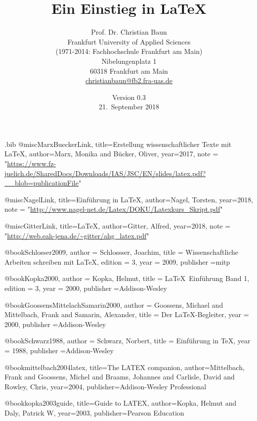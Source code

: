 \documentclass[a4paper,10pt,twoside]{scrbook}
\begin{document}
\begin{filecontents*}{\jobname.bib}
@misc{MarxBueckerLink,
	title={{Erstellung wissenschaftlicher Texte mit \LaTeX}},
	author={Marx, Monika and Bücker, Oliver},
	year={2017},
	note = "\url{https://www.fz-juelich.de/SharedDocs/Downloads/IAS/JSC/EN/slides/latex.pdf?__blob=publicationFile}"
}
   
@misc{NagelLink,
   	title={{Einführung in \LaTeX}},
   	author={Nagel, Torsten},
   	year={2018},
   	note = "\url{http://www.nagel-net.de/Latex/DOKU/Latexkurs_Skript.pdf}"
}

@misc{GitterLink,
	title={{\LaTeX}},
	author={Gitter, Alfred},
	year={2018},
	note = "\url{http://web.eah-jena.de/~gitter/ahg_latex.pdf}"
}

@book{Schlosser2009,
	author = {Schlossser, Joachim},
	title = {{Wissenschaftliche Arbeiten schreiben mit \LaTeX}},
	edition = {3},
	year = {2009},
	publisher ={mitp}
}


@book{Kopka2000,
	author = {Kopka, Helmut},
	title = {{\LaTeX\ Einführung Band 1}},
	edition = {3},
	year = {2000},
	publisher ={Addison-Wesley}
}


@book{GoossensMittelachSamarin2000,
	author = {Goossens, Michael and Mittelbach, Frank and Samarin, Alexander},
	title = {{Der \LaTeX-Begleiter}},
	year = {2000},
	publisher ={Addison-Wesley}
}


@book{Schwarz1988,
	author = {Schwarz, Norbert},
	title = {{Einführung in \TeX}},
	year = {1988},
    publisher ={Addison-Wesley}
}
  
@book{mittelbach2004latex,
	title={The LATEX companion},
	author={Mittelbach, Frank and Goossens, Michel and Braams, Johannes and Carlisle, David and Rowley, Chris},
	year={2004},
	publisher={Addison-Wesley Professional}
}

@book{kopka2003guide,
	title={Guide to LATEX},
	author={Kopka, Helmut and Daly, Patrick W},
	year={2003},
	publisher={Pearson Education}
}

\end{filecontents*}

\renewcommand{\arraystretch}{1}

\title{Ein Einstieg in \LaTeX}
\author{Prof. Dr. Christian Baun\\ Frankfurt University of Applied Sciences \\ (1971-2014: Fachhochschule Frankfurt am Main)\\
Nibelungenplatz 1 \\ 60318 Frankfurt am Main\\\url{christianbaun@fb2.fra-uas.de}\\[3em]}
\date{Version 0.3\\[3em] 21.~September 2018}
\end{document}
